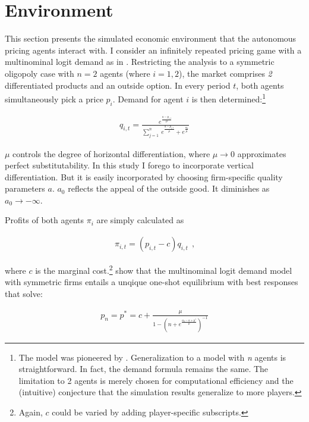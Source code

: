 \section{Environment}\label{enironment}

This section presents the simulated economic environment that the autonomous pricing agents interact with. I consider an infinitely repeated pricing game with a multinominal logit demand as in \textcite[p.3273]{calvano_artificial_2020}. Restricting the analysis to a symmetric oligopoly case with $n=2$ agents (where $i = 1,2$), the market comprises \emph{2} differentiated products and an outside option. In every period $t$, both agents simultaneously pick a price $p_i$. Demand for agent $i$ is then determined:\footnote{The model was pioneered by \textcite{anderson_logit_1992}. Generalization to a model with \emph{n} agents is straightforward. In fact, the demand formula remains the same. The limitation to 2 agents is merely chosen for computational efficiency and the (intuitive) conjecture that the simulation results generalize to more players.}

\begin{gather}\label{quantity}
q_{i,t}=\frac{e^{\frac{a - p_{i,t}}{\mu}}}{\sum_{j=1}^{n}~ e^{\frac{a-p_{j,t}}{\mu}}+e^{\frac{a_0}{\mu}}}
\end{gather}

$\mu$ controls the degree of horizontal differentiation, where $\mu \rightarrow 0$ approximates perfect substitutability. In this study I forego to incorporate vertical differentiation. But it is easily incorporated by choosing firm-specific quality parameters $a$. $a_0$ reflects the appeal of the outside good. It diminishes as $a_0 \rightarrow -\infty$. 

Profits of both agents $\pi_i$ are simply calculated as

\begin{gather}\label{profit}
\pi_{i,t} = (p_{i,t} - c) q_{i,t} ~~ \text{,}
\end{gather}

where $c$ is the marginal cost.\footnote{Again, $c$ could be varied by adding player-specific subscripts.} \textcite{anderson_logit_1992} show that the multinominal logit demand model with symmetric firms entails a unqique one-shot equilibrium with best responses that solve:

\begin{gather}\label{best_response}
	p_n = p^* = c + \frac{\mu}{1 - (n + e^{\frac{a_0 - a + p^*}{\mu}})^{-1}}
\end{gather}

